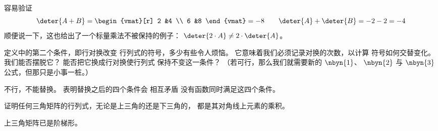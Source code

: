 \begin{exercises}
\begin{answer}
      容易验证
      \begin{equation*}
         \deter{A+B}
         =
         \begin{vmat}[r]
           2  &4  \\
           6  &8
         \end{vmat}
         =-8
         \qquad
         \deter{A}+\deter{B}
         =
         -2-2
         =-4
      \end{equation*}
      顺便说一下，这也给出了一个标量乘法不被保持的例子：
      $\deter{2\cdot A}\neq 2\cdot\deter{A}$。  
     \end{answer}
  \item 
    定义中的第二个条件，即行对换改变
    行列式的符号，多少有些令人烦恼。
    它意味着我们必须记录对换的次数，以计算
    符号如何交替变化。
    我们能否摆脱它？
    能否把它换成行对换使行列式
    保持不变这一条件？
    （若可行，那么我们就需要新的 $\nbyn{1}$、
     $\nbyn{2}$ 与 $\nbyn{3}$ 公式，但那只是小事一桩。）
    \begin{answer}
      不行，不能替换。
      表明替换之后的四个条件会
      相互矛盾 \Dash  没有函数同时满足这四个条件。
    \end{answer}
  \item 
    证明任何三角矩阵的行列式，无论是上三角的还是下三角的，
    都是其对角线上元素的乘积。
    \begin{answer}
      上三角矩阵已是阶梯形。


\end{answer}
\end{exercises}
